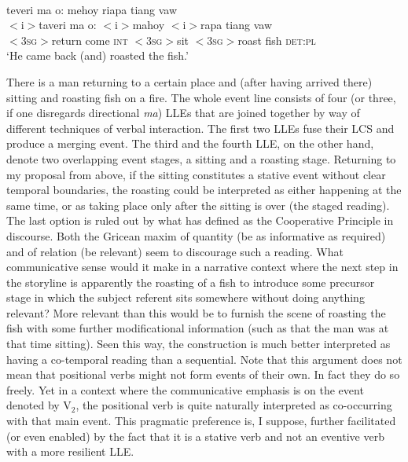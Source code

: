 {\ea \label{mehoy_2}
\\
\glll teveri ma o: mehoy riapa tiang vaw \\
$<$i$>$taveri ma o: $<$i$>$mahoy $<$i$>$rapa tiang vaw \\
$<$3\textsc{sg}$>$return come \textsc{int} $<$3\textsc{sg}$>$sit $<$3\textsc{sg}$>$roast fish \textsc{det}:\textsc{pl}\\
\glft `He came back (and) roasted the fish.' \\ 
\z

There is a man returning to a certain place and (after having arrived there) sitting and roasting fish on a fire. The whole event line consists of four (or three, if one disregards directional \textit{ma}) LLEs that are joined together by way of different techniques of verbal interaction. The first two LLEs fuse their LCS and produce a merging event. The third and the fourth LLE, on the other hand, denote two overlapping event stages, a sitting and a roasting stage. Returning to my proposal from above, if the sitting constitutes a stative event without clear temporal boundaries, the roasting could be interpreted as either happening at the same time, or as taking place only after the sitting is over (the staged reading). The last option is ruled out by what \citet{grice1989studies} has defined as the Cooperative Principle in discourse. Both the Gricean maxim of quantity (be as informative as required) and of relation (be relevant) seem to discourage such a reading. What communicative sense would it make in a narrative context where the next step in the storyline is apparently the roasting of a fish to introduce some precursor stage in which the subject referent sits somewhere without doing anything relevant? More relevant than this would be to furnish the scene of roasting the fish with some further modificational information (such as that the man was at that time sitting). Seen this way, the construction is much better interpreted as having a co-temporal reading than a sequential. Note that this argument does not mean that positional verbs might not form events of their own. In fact they do so freely. Yet in a context where the communicative emphasis is on the event denoted by V$_2$, the positional verb is quite naturally interpreted as co-occurring with that main event. This pragmatic preference is, I suppose, further facilitated (or even enabled) by the fact that it is a stative verb and not an eventive verb with a more resilient LLE. 

}
